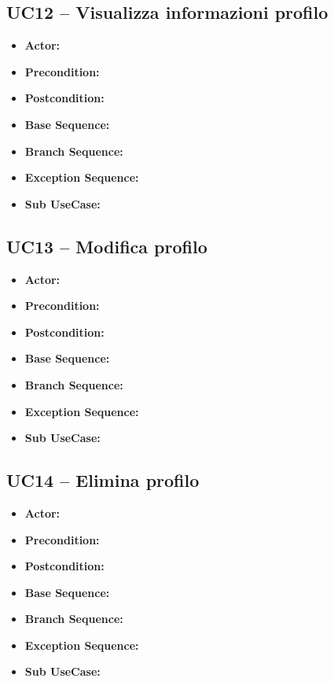\subsection{\textbf{UC12 -- Visualizza informazioni profilo}}
\begin{itemize}
    \item \textbf{Actor:}
    \item \textbf{Precondition:}
    \item \textbf{Postcondition:}
    \item \textbf{Base Sequence:}
    \item \textbf{Branch Sequence:}
    \item \textbf{Exception Sequence:}
    \item \textbf{Sub UseCase:}
\end{itemize}

\subsection{\textbf{UC13 -- Modifica profilo}}
\begin{itemize}
    \item \textbf{Actor:}
    \item \textbf{Precondition:}
    \item \textbf{Postcondition:}
    \item \textbf{Base Sequence:}
    \item \textbf{Branch Sequence:}
    \item \textbf{Exception Sequence:}
    \item \textbf{Sub UseCase:}
\end{itemize}

\subsection{\textbf{UC14 -- Elimina profilo}}
\begin{itemize}
    \item \textbf{Actor:}
    \item \textbf{Precondition:}
    \item \textbf{Postcondition:}
    \item \textbf{Base Sequence:}
    \item \textbf{Branch Sequence:}
    \item \textbf{Exception Sequence:}
    \item \textbf{Sub UseCase:}
\end{itemize}


